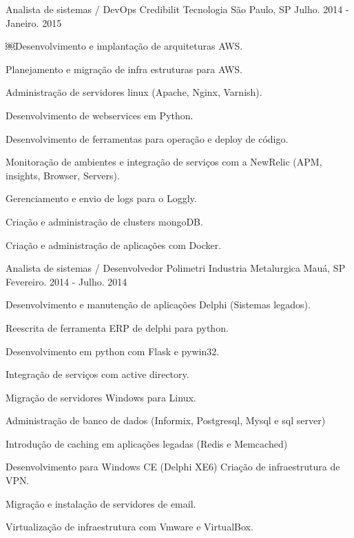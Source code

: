 \begin{cventries}
  \cventry
    {Analista de sistemas / DevOps} %
    {Credibilit Tecnologia} %
    {São Paulo, SP} %
    {Julho. 2014 - Janeiro. 2015} %
    {
      \begin{cvitems} %
        \item {￼Desenvolvimento e implantação de arquiteturas AWS.}
        \item {Planejamento e migração de infra estruturas para AWS.}
        \item {Administração de servidores linux (Apache, Nginx, Varnish).}
        \item {Desenvolvimento de webservices em Python.}
        \item {Desenvolvimento de ferramentas para operação e deploy de código.}
        \item {Monitoração de ambientes e integração de serviços com a NewRelic (APM, insights, Browser, Servers).}
        \item {Gerenciamento e envio de logs para o Loggly.}
        \item {Criação e administração de clusters mongoDB.}
        \item {Criação e administração de aplicações com Docker.}
      \end{cvitems}
    }

  \cventry
    {Analista de sistemas / Desenvolvedor} %
    {Polimetri Industria Metalurgica} %
    {Mauá, SP} %
    {Fevereiro. 2014 - Julho. 2014} %
    {
      \begin{cvitems} %
          \item {Desenvolvimento e manutenção de aplicações Delphi (Sistemas legados).}
          \item {Reescrita de ferramenta ERP de delphi para python.}
          \item {Desenvolvimento em python com Flask e pywin32.}
          \item {Integração de serviços com active directory.}
          \item {Migração de servidores Windows para Linux.}
          \item {Administração de banco de dados (Informix, Postgresql, Mysql e sql server)}
          \item {Introdução de caching em aplicações legadas (Redis e Memcached)}
          \item {Desenvolvimento para Windows CE (Delphi XE6) Criação de infraestrutura de VPN.}
          \item {Migração e instalação de servidores de email.}
          \item {Virtualização de infraestrutura com Vmware e VirtualBox.}
      \end{cvitems}
    }


\end{cventries}
